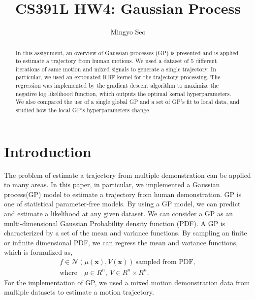 \documentclass[conference]{IEEEtran}
\begin{document}
\title{CS391L HW4: Gaussian Process}

\author{Mingyo Seo}

\author{
}



\maketitle

\IEEEpeerreviewmaketitle

\begin{abstract}
In this assignment, an overview of Gaussian processes (GP) is presented and is applied to estimate a trajectory from human motions.
We used a dataset of 5 different iterations of same motion and mixed signals to generate a single trajectory.
In particular, we used an exponated RBF kernel for the trajectory processing.
The regression was implemented by the gradient descent algorithm to maximize the negative log likelihood function, which outputs the optimal kernal hyperparameters.
We also compared the use of a single global GP and a set of GP's fit to local data, and studied how the local GP's hyperparameters change.

\end{abstract}

\section{Introduction} %

The problem of estimate a trajectory from multiple demonstration can be applied to many areas.
In this paper, in particular, we implemented a Gaussian process(GP) model to estimate a trajectory from human demonstration. 
GP is one of statistical parameter-free models.
By using a GP model, we can predict and estimate a likelihood at any given dataset.
We can consider a GP as an multi-dimensional Gaussian Probability density function (PDF).
A GP is characterized by a set of the mean and variance functions.
By sampling an finite or infinite dimensional PDF, we can regress the mean and variance functions, which is formulized as,
\begin{equation}
\begin{aligned}
    f \in \mathcal{N}(\mu(\boldsymbol{x}),V(\boldsymbol{x}))\ \text{sampled from PDF},\\
    \text{where} \quad \mu \in R^n,\ V\in R^n\times R^n.
\end{aligned}
\end{equation}
For the implementation of GP, we used a mixed motion demonstration data from multiple datasets to estimate a motion trajcetory.
\end{document}
